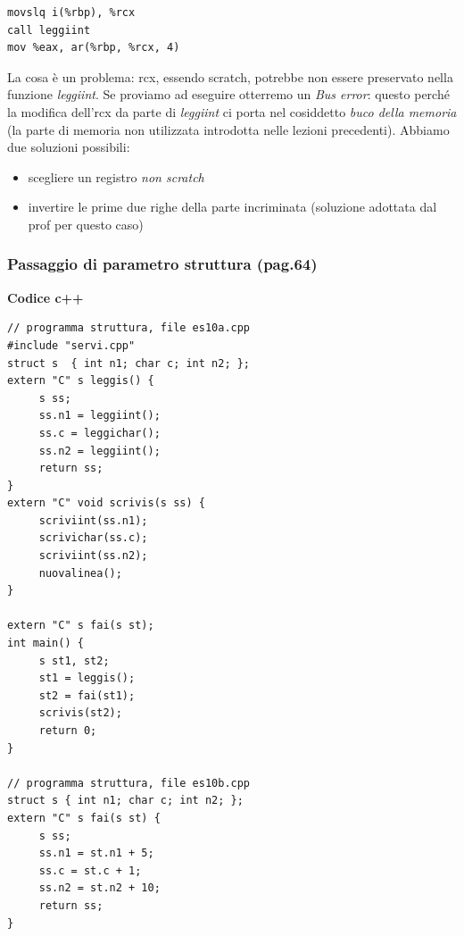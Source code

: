 \documentclass[11pt]{report}
\theoremstyle{definition}
\begin{document}
\begin{itemize}
\begin{framed}
\begin{verbatim}
movslq i(%rbp), %rcx
call leggiint
mov %eax, ar(%rbp, %rcx, 4)
\end{verbatim}
La cosa è un problema: rcx, essendo scratch, potrebbe non essere preservato nella funzione \emph{leggiint}. Se proviamo ad eseguire otterremo un \emph{Bus error}: questo perché la modifica dell'rcx da parte di \emph{leggiint} ci porta nel cosiddetto \emph{buco della memoria} (la parte di memoria non utilizzata introdotta nelle lezioni precedenti). Abbiamo due soluzioni possibili:
\begin{itemize}
\item scegliere un registro \emph{non scratch}
\item invertire le prime due righe della parte incriminata (soluzione adottata dal prof per questo caso)
\end{itemize}
\end{framed}
\end{itemize}

\subsubsection{Passaggio di parametro struttura (pag.64)}
\begin{framed}
\noindent \textbf{Codice c++} 
\begin{multicols}{2}
\begin{verbatim}
// programma struttura, file es10a.cpp
#include "servi.cpp"
struct s  { int n1; char c; int n2; };
extern "C" s leggis() {
     s ss;
     ss.n1 = leggiint();
     ss.c = leggichar();
     ss.n2 = leggiint();
     return ss; 
}
extern "C" void scrivis(s ss) {
     scriviint(ss.n1);
     scrivichar(ss.c);
     scriviint(ss.n2);
     nuovalinea();
}

extern "C" s fai(s st);
int main() {
     s st1, st2;
     st1 = leggis();
     st2 = fai(st1);
     scrivis(st2);
     return 0;
}

// programma struttura, file es10b.cpp
struct s { int n1; char c; int n2; };
extern "C" s fai(s st) {
     s ss;
     ss.n1 = st.n1 + 5;
     ss.c = st.c + 1;
     ss.n2 = st.n2 + 10;
     return ss;
}
\end{verbatim}
\end{multicols}
\end{framed}
\end{document}
